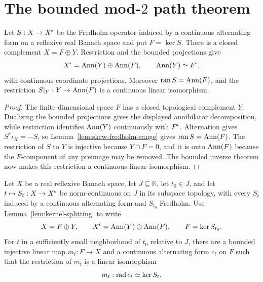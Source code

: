 \section{The bounded mod-\texorpdfstring{$2$}{2} path theorem}

\begin{lemma}\label{lem:kernel-splitting}
Let $S:X\to{X}^{\!*}$ be the Fredholm operator induced by a continuous alternating form on a reflexive
real Banach space and put $F=\ker S$.  There is a closed complement $X=F\oplus Y$.  Restriction
and the bounded projections give
\[
 {X}^{\!*}=\operatorname{Ann}(Y)\oplus\operatorname{Ann}(F),\qquad \operatorname{Ann}(Y)\simeq{F}^{\!*},
\]
with continuous coordinate projections.  Moreover $\operatorname{ran} S=\operatorname{Ann}(F)$, and the restriction
$S|_Y:Y\to\operatorname{Ann}(F)$ is a continuous linear isomorphism.
\leanok
\end{lemma}

\begin{proof}
The finite-dimensional space $F$ has a closed topological complement $Y$.  Dualizing the bounded
projections gives the displayed annihilator decomposition, while restriction identifies
$\operatorname{Ann}(Y)$ continuously with ${F}^{\!*}$.  Alternation gives $S^*\iota_X=-S$, so
Lemma~\ref{lem:skew-fredholm-range} gives $\operatorname{ran} S=\operatorname{Ann}(F)$.  The restriction of $S$ to $Y$ is
injective because $Y\cap F=0$, and it is onto $\operatorname{Ann}(F)$ because the $F$-component of any preimage
may be removed.  The bounded inverse theorem now makes this restriction a continuous linear
isomorphism.
\end{proof}

\begin{lemma}\label{lem:schur-reduction}
Let $X$ be a real reflexive Banach space, let $J\subseteq\mathbb R$, let $t_0\in J$, and let
$t\mapsto S_t:X\to{X}^{\!*}$ be norm-continuous
on $J$ in its subspace topology, with every $S_t$ induced by a continuous alternating form and
$S_{t_0}$ Fredholm.  Use
Lemma~\ref{lem:kernel-splitting} to write
\[
 X=F\oplus Y,\qquad {X}^{\!*}=\operatorname{Ann}(Y)\oplus\operatorname{Ann}(F),
 \qquad F=\ker S_{t_0}.
\]
For $t$ in a sufficiently small neighborhood of $t_0$ relative to $J$, there are a bounded
injective linear map $m_t:F\to X$ and a continuous alternating form $c_t$ on $F$ such that the
restriction of $m_t$ is a linear isomorphism
\[
  m_t:\operatorname{rad} c_t\simeq\ker S_t.
\]
\leanok
\end{lemma}

